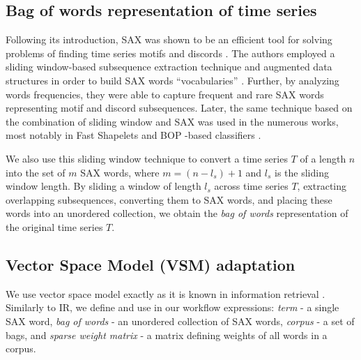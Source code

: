 \documentclass[conference]{IEEEtran}
\begin{document}
\subsection{Bag of words representation of time series} \label{bow_representation}
Following its introduction, SAX was shown to be an efficient tool for solving problems 
of finding time series motifs and discords \cite{hot_sax}. 
The authors employed a sliding window-based subsequence extraction technique 
and augmented data structures in order to build SAX words ``vocabularies'' \cite{hot_sax}.
Further, by analyzing words frequencies, they were able to capture frequent and rare 
SAX words representing motif and discord subsequences. 
Later, the same technique based on the combination of sliding window and SAX 
was used in the numerous works, most notably in Fast Shapelets \cite{fast-shapelets}
and BOP -based classifiers \cite{bag_patterns}. 

We also use this sliding window technique to convert a time series $T$ of a length $n$ into 
the set of $m$ SAX words, where $m=(n-l_{s})+1$ and $l_{s}$ is the sliding window length. 
By sliding a window of length $l_{s}$ across time series $T$, extracting overlapping 
subsequences, converting them to SAX words, and placing these words into an 
unordered collection, we obtain the \textit{bag of words} representation of 
the original time series $T$.

\subsection{Vector Space Model (VSM) adaptation}
We use vector space model exactly as it is known in information retrieval \cite{salton}. 
Similarly to IR, we define and use in our workflow expressions:
\textit{term} - a single SAX word, 
\textit{bag of words} - an unordered collection of SAX words, 
\textit{corpus} - a set of bags, and 
\textit{sparse weight matrix} - a matrix defining weights of all words in a corpus. 
\end{document}
